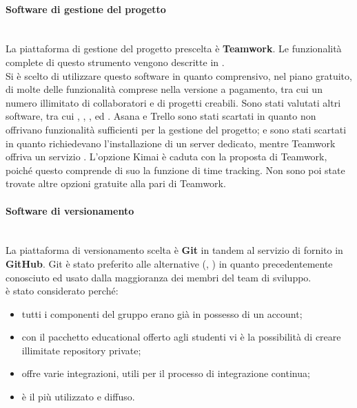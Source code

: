 \paragraph{Software di gestione del progetto}\mbox{}\\
La piattaforma di gestione del progetto prescelta è \textbf{Teamwork}. Le funzionalità complete di questo strumento vengono descritte in .\\
Si è scelto di utilizzare questo software in quanto comprensivo, nel piano gratuito, di molte delle funzionalità comprese nella versione a pagamento, tra cui un numero illimitato di collaboratori e di progetti creabili. Sono stati valutati altri software, tra cui , , ,  ed . Asana e Trello sono stati scartati in quanto non offrivano funzionalità sufficienti per la gestione del progetto;  e  sono stati scartati in quanto richiedevano l'installazione di un server dedicato, mentre Teamwork offriva un servizio . L'opzione Kimai è caduta con la proposta di Teamwork, poiché questo comprende di suo la funzione di time tracking. Non sono poi state trovate altre opzioni gratuite alla pari di Teamwork.

\paragraph{Software di versionamento}\mbox{}\\
La piattaforma di versionamento scelta è \textbf{Git} in tandem al servizio di  fornito in \textbf{GitHub}. Git è stato preferito alle alternative (, ) in quanto precedentemente conosciuto ed usato dalla maggioranza dei membri del team di sviluppo.\\
 è stato considerato perché:
\begin{itemize}
	\item tutti i componenti del gruppo erano già in possesso di un account;
	\item con il pacchetto educational offerto agli studenti vi è la possibilità di creare illimitate repository private;
	\item offre varie integrazioni, utili per il processo di integrazione continua;
	\item è il più utilizzato e diffuso.
\end{itemize}


